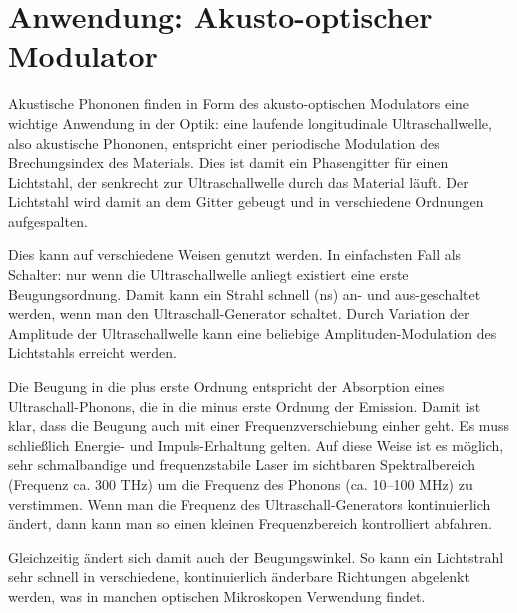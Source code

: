 \section{Anwendung: Akusto-optischer Modulator}

Akustische Phononen finden in Form des  akusto-optischen Modulators eine wichtige Anwendung in der Optik: eine laufende longitudinale Ultraschallwelle, also akustische Phononen, entspricht einer periodische Modulation des Brechungsindex des Materials. Dies ist damit ein Phasengitter für einen Lichtstahl, der senkrecht zur Ultraschallwelle durch das Material läuft. Der Lichtstahl wird damit an dem Gitter gebeugt und in verschiedene Ordnungen aufgespalten.

Dies kann auf verschiedene Weisen genutzt werden. In einfachsten Fall als Schalter: nur wenn die Ultraschallwelle anliegt existiert eine erste Beugungsordnung. Damit kann ein Strahl schnell (ns) an- und aus-geschaltet werden, wenn man den Ultraschall-Generator schaltet. Durch Variation der Amplitude der Ultraschallwelle kann eine beliebige Amplituden-Modulation des Lichtstahls erreicht werden.

Die Beugung in die plus erste Ordnung entspricht der Absorption eines Ultraschall-Phonons, die in die minus erste Ordnung der Emission. Damit ist klar, dass die Beugung auch mit einer Frequenzverschiebung einher geht. Es muss schließlich Energie- und Impuls-Erhaltung gelten. Auf diese Weise ist es möglich, sehr schmalbandige und frequenzstabile Laser im sichtbaren Spektralbereich (Frequenz ca. 300 THz) um die Frequenz des Phonons (ca. 10--100 MHz) zu verstimmen. Wenn man die Frequenz des  Ultraschall-Generators kontinuierlich ändert, dann kann man so einen kleinen Frequenzbereich kontrolliert abfahren.

Gleichzeitig ändert sich damit auch der Beugungswinkel. So kann ein Lichtstrahl sehr schnell in verschiedene, kontinuierlich änderbare Richtungen abgelenkt werden, was in manchen optischen Mikroskopen Verwendung findet.








\printbibliography[segment=\therefsegment,heading=subbibliography]
